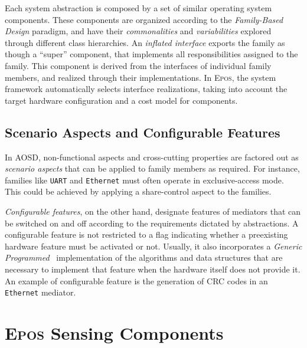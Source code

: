 Each system abstraction is composed by a set of similar operating
system components. These components are organized according to the
\emph{Family-Based Design} paradigm, and have their \emph{commonalities}
and \emph{variabilities} explored through different class hierarchies.
An \emph{inflated interface} exports the family as though a ``super''
component, that implements all responsibilities assigned to the
family. This component is derived from the interfaces of individual
family members, and realized through their implementations. In \textsc{Epos},
the system framework automatically selects interface realizations,
taking into account the target hardware configuration and a cost model
for components.


\subsection{Scenario Aspects and Configurable Features}

In AOSD, non-functional aspects
and cross-cutting properties are factored out as \emph{scenario aspects}
that can be applied to family members as required. For instance,
families like \texttt{UART} and \texttt{Ethernet} must often operate in
exclusive-access mode.  This could be achieved by applying a
share-control aspect to the families.

\emph{Configurable features}, on the other hand,
designate features of mediators that can be switched
on and off according to the requirements dictated by abstractions.  
A configurable feature is not restricted to a flag indicating whether a
preexisting hardware feature must be activated or not. Usually, it
also incorporates a \emph{Generic Programmed}~\cite{Musser:1989}
implementation of the algorithms and data structures that are
necessary to implement that feature when the hardware itself does not
provide it.  An example of configurable feature is the generation of
CRC codes in an \texttt{Ethernet} mediator.



\section{\textsc{Epos} Sensing Components }

